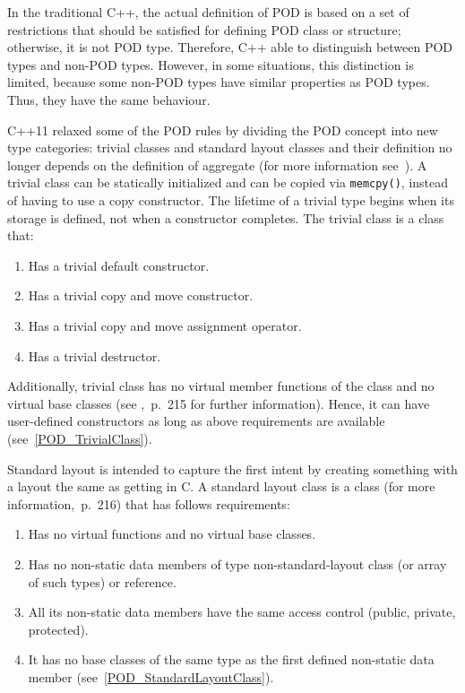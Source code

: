 \documentclass[11pt]{report}
\begin{document}
In the traditional C++, the actual definition of POD is based on a set of restrictions that should be satisfied for defining POD class or structure; otherwise, it is not POD type. Therefore, C++ able to distinguish between POD types and non-POD types. However, in some situations, this distinction is limited, because some non-POD types have similar properties as POD types. Thus, they have the same behaviour.

C++11 relaxed some of the POD rules by dividing the POD concept into new type categories: trivial classes and standard layout classes and their definition no longer depends on the definition of aggregate (for more information see~\cite{MSDN:2012:CppModern}). A trivial class can be statically initialized and can be copied via \texttt{memcpy()}, instead of having to use a copy constructor. The lifetime of a trivial type begins when its storage is defined, not when a constructor completes. The trivial class is a class that:
\begin{enumerate}
\item	Has a trivial default constructor. 
\item	Has a trivial copy and move constructor.
\item	Has a trivial copy and move assignment operator.
\item	Has a trivial destructor.
\end{enumerate}

Additionally, trivial class has no virtual member functions of the class and no virtual base classes (see \cite{ISO:2011:Cpplanguage},~p.~215 for further information). Hence, it can have user-defined constructors as long as above requirements are available (see~\ref{POD_TrivialClass}).

Standard layout is intended to capture the first intent by creating something with a layout the same as getting in C. A standard layout class is a class (for more information\cite{ISO:2011:Cpplanguage},~p.~216) that has follows requirements:

\begin{enumerate}
\item	Has no virtual functions and no virtual base classes.
\item	Has no non-static data members of type non-standard-layout class (or array of such types) or reference.
\item	All its non-static data members have the same access control (public, private, protected).
\item	It has no base classes of the same type as the first defined non-static data member (see~\ref{POD_StandardLayoutClass}).
\end{enumerate}
\end{document}
